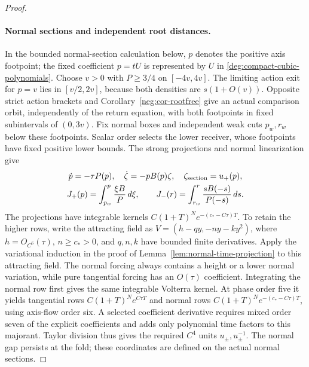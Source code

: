 \begin{proof}
\paragraph{Normal sections and independent root distances.}
In the bounded normal-section calculation below, \(p\) denotes the
positive axis footpoint; the fixed coefficient \(p=tU\) is represented
by \(U\) in \eqref{deg:compact-cubic-polynomials}.
Choose \(v>0\) with \(P\ge3/4\) on \([-4v,4v]\).
The limiting action exit for \(p=v\) lies in \([v/2,2v]\), because
both densities are \(s(1+O(v))\). Opposite strict action brackets and
Corollary~\ref{neg:cor-rootfree} give an actual comparison orbit,
independently of the return equation, with both footpoints in fixed
subintervals of \((0,3v)\).
Fix normal boxes and independent weak cuts \(p_w,r_w\) below these
footpoints. Scalar order selects the lower receiver, whose footpoints
have fixed positive lower bounds. The strong projections and normal
linearization give
\[
 \begin{gathered}
 \dot p=-\tau P(p),\quad\dot\zeta=-pB(p)\zeta,\quad\zeta_{\rm section}=u_+(p),\\
 J_+(p)=\int_{p_w}^p\frac{\xi B}{P}\,d\xi,\qquad
 J_-(r)=\int_{r_w}^r\frac{sB(-s)}{P(-s)}\,ds.
 \end{gathered}
\]
The projections have integrable kernels
\(C(1+T)^N e^{-(c_*-C\tau)T}\). To retain the higher rows, write
the attracting field as
\(V=(h-qy,-ny-ky^2)\), where \(h=O_{C^6}(\tau)\),
\(n\ge c_*>0\), and \(q,n,k\) have bounded finite derivatives.
Apply the variational induction in the proof of
Lemma~\ref{lem:normal-time-projection} to this attracting field.
The normal forcing always contains a height or a lower normal
variation, while pure tangential forcing has an \(O(\tau)\)
coefficient. Integrating the normal row first gives the same integrable
Volterra kernel. At phase order five it yields tangential rows
\(C(1+T)^Ne^{C\tau T}\) and normal rows
\(C(1+T)^Ne^{-(c_*-C\tau)T}\), using axis-flow order six.
A selected coefficient derivative requires mixed order seven of the
explicit coefficients and adds only polynomial time factors to this
majorant. Taylor division thus gives the required \(C^4\) units
\(u_\pm,u_\pm^{-1}\). The normal gap persists at the fold; these
coordinates are defined on the actual normal sections.


\end{proof}
